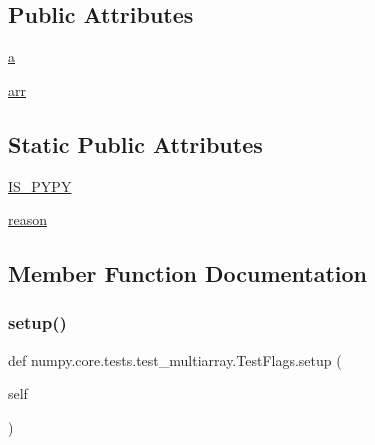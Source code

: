 \subsection*{Public Attributes}
\begin{DoxyCompactItemize}
\item 
\hyperlink{classnumpy_1_1core_1_1tests_1_1test__multiarray_1_1TestFlags_ac97c8c3455ce470b5ad037ea5049da77}{a}
\item 
\hyperlink{classnumpy_1_1core_1_1tests_1_1test__multiarray_1_1TestFlags_a0a68f0f407aee9c0f20678210449283a}{arr}
\end{DoxyCompactItemize}
\subsection*{Static Public Attributes}
\begin{DoxyCompactItemize}
\item 
\hyperlink{classnumpy_1_1core_1_1tests_1_1test__multiarray_1_1TestFlags_a6d7dbbb988c649a949c784d82c06e5d1}{I\+S\+\_\+\+P\+Y\+PY}
\item 
\hyperlink{classnumpy_1_1core_1_1tests_1_1test__multiarray_1_1TestFlags_ab1cf91bf52e165319cf9841aa3696fdd}{reason}
\end{DoxyCompactItemize}


\subsection{Member Function Documentation}
\mbox{\label{classnumpy_1_1core_1_1tests_1_1test__multiarray_1_1TestFlags_afee0b6cabffb042654de61851282c26a}} 
\subsubsection{\texorpdfstring{setup()}{setup()}}
{\footnotesize\ttfamily def numpy.\+core.\+tests.\+test\+\_\+multiarray.\+Test\+Flags.\+setup (\begin{DoxyParamCaption}\item[{}]{self }\end{DoxyParamCaption})}

